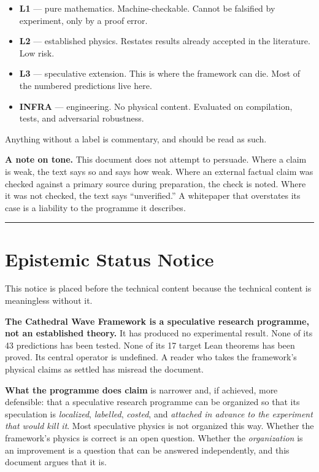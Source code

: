 \documentclass[
  11pt]{report}
\providecommand{\tightlist}{%
  \setlength{\itemsep}{0pt}\setlength{\parskip}{0pt}}
\begin{document}
\begin{itemize}
\tightlist
\item
  \textbf{L1} --- pure mathematics. Machine-checkable. Cannot be
  falsified by experiment, only by a proof error.
\item
  \textbf{L2} --- established physics. Restates results already accepted
  in the literature. Low risk.
\item
  \textbf{L3} --- speculative extension. This is where the framework can
  die. Most of the numbered predictions live here.
\item
  \textbf{INFRA} --- engineering. No physical content. Evaluated on
  compilation, tests, and adversarial robustness.
\end{itemize}

Anything without a label is commentary, and should be read as such.

\textbf{A note on tone.} This document does not attempt to persuade.
Where a claim is weak, the text says so and says how weak. Where an
external factual claim was checked against a primary source during
preparation, the check is noted. Where it was not checked, the text says
``unverified.'' A whitepaper that overstates its case is a liability to
the programme it describes.

\begin{center}\rule{0.5\linewidth}{0.5pt}\end{center}

\hypertarget{epistemic-status-notice}{%
\chapter{Epistemic Status Notice}\label{epistemic-status-notice}}

This notice is placed before the technical content because the technical
content is meaningless without it.

\textbf{The Cathedral Wave Framework is a speculative research
programme, not an established theory.} It has produced no experimental
result. None of its 43 predictions has been tested. None of its 17
target Lean theorems has been proved. Its central operator is undefined.
A reader who takes the framework's physical claims as settled has
misread the document.

\textbf{What the programme does claim} is narrower and, if achieved,
more defensible: that a speculative research programme can be organized
so that its speculation is \emph{localized}, \emph{labelled},
\emph{costed}, and \emph{attached in advance to the experiment that
would kill it}. Most speculative physics is not organized this way.
Whether the framework's physics is correct is an open question. Whether
the \emph{organization} is an improvement is a question that can be
answered independently, and this document argues that it is.
\end{document}
